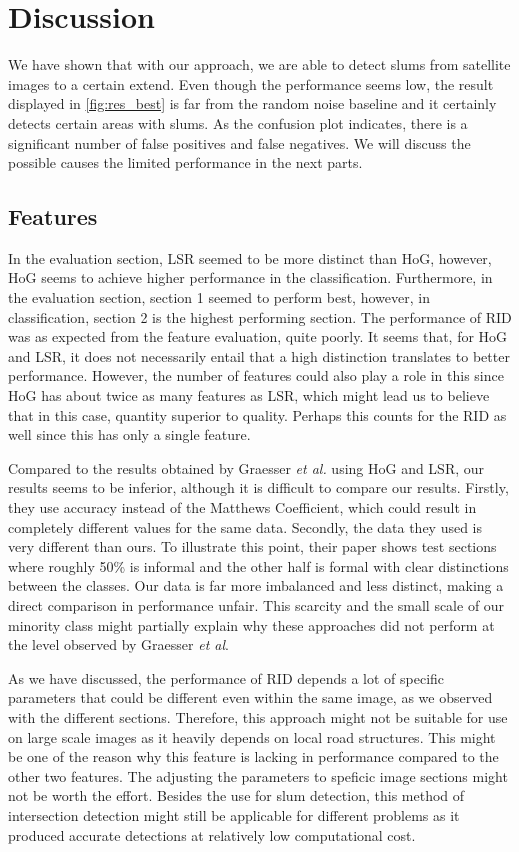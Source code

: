 \section{Discussion}
We have shown that with our approach, we are able to detect slums from satellite images to a certain extend. Even though the performance seems low, the result displayed in \ref{fig:res_best} is far from the random noise baseline and it certainly detects certain areas with slums. As the confusion plot indicates, there is a significant number of false positives and false negatives. We will discuss the possible causes the limited performance in the next parts.

\subsection{Features}
In the evaluation section, LSR seemed to be more distinct than HoG, however, HoG seems to achieve higher performance in the classification. Furthermore, in the evaluation section, section 1 seemed to perform best, however, in classification, section 2 is the highest performing section. The performance of RID was as expected from the feature evaluation, quite poorly. It seems that, for HoG and LSR, it does not necessarily entail that a high distinction translates to better performance. However, the number of features could also play a role in this since HoG has about twice as many features as LSR, which might lead us to believe that in this case, quantity superior to quality. Perhaps this counts for the RID as well since this has only a single feature.

Compared to the results obtained by Graesser \textit{et al.} using HoG and LSR, our results seems to be inferior, although it is difficult to compare our results. Firstly, they use accuracy instead of the Matthews Coefficient, which could result in completely different values for the same data. Secondly, the data they used is very different than ours. To illustrate this point, their paper shows test sections where roughly 50\% is informal and the other half is formal with clear distinctions between the classes. Our data is far more imbalanced and less distinct, making a direct comparison in performance unfair. This scarcity and the small scale of our minority class might partially explain why these approaches did not perform at the level observed by Graesser \textit{et al}.

As we have discussed, the performance of RID depends a lot of specific parameters that could be different even within the same image, as we observed with the different sections. Therefore, this approach might not be suitable for use on large scale images as it heavily depends on local road structures. This might be one of the reason why this feature is lacking in performance compared to the other two features. The adjusting the parameters to speficic image sections might not be worth the effort. Besides the use for slum detection, this method of intersection detection might still be applicable for different problems as it produced accurate detections at relatively low computational cost.

